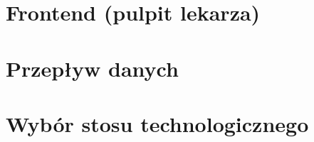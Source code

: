 \section{Frontend (pulpit lekarza)}\label{sec:frontend}

%

\section{Przepływ danych}\label{sec:przeplyw-danych}

%
%
%

\section{Wybór stosu technologicznego}\label{sec:stos}

%
